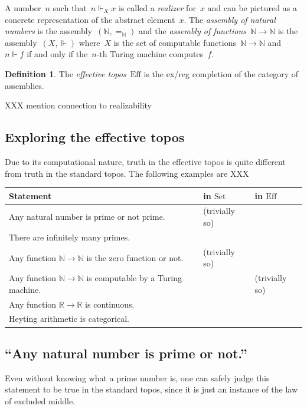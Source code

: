 \documentclass[oneside,reqno]{amsart}
\newcommand{\cmark}{\ding{51}}
\newcommand{\xmark}{\ding{55}}
\theoremstyle{definition}
\newtheorem{defn}{Definition}[section]
\theoremstyle{plain}
\theoremstyle{remark}
\newcommand{\NN}{\mathbb{N}}
\newcommand{\RR}{\mathbb{R}}
\newcommand{\Set}{\mathrm{Set}}
\newcommand{\Eff}{\mathrm{Ef{}f}}
\renewcommand{\_}{\mathpunct{.}\,}
\newcommand{\effective}{ef{}fective\xspace}
\newcommand{\?}{\,{:}\,}
\newcommand{\realizes}{\Vdash}
\begin{document}
A number~$n$ such that~$n \realizes_X x$ is called a \emph{realizer} for~$x$
and can be pictured as a concrete representation of the abstract element~$x$.
The \emph{assembly of natural numbers} is the assembly~$(\NN,{=_\NN})$ and the
\emph{assembly of functions~$\NN \to \NN$} is the
assembly~$(X,{\realizes})$ where~$X$ is the set of computable functions~$\NN
\to \NN$ and~$n \realizes f$ if and only if the~$n$-th Turing machine
computes~$f$.

\begin{defn}The \emph{\effective topos}~$\Eff$ is the ex/reg completion of the
category of assemblies.\end{defn}

XXX mention connection to realizability


\subsection{Exploring the \effective topos}
\label{sect:eff-examples}
Due to its computational nature, truth in the \effective topos is quite
different from truth in the standard topos. The following examples are XXX

\begin{tabular}{lll}
  \toprule
  Statement & in $\Set$ & in $\Eff$ \\
  \midrule
  Any natural number is prime or not prime. & \cmark{} (trivially so) & \cmark \\
  There are infinitely many primes. & \cmark & \cmark \\
  Any function $\NN \to \NN$ is the zero function or not. & \cmark{} (trivially so) & \xmark \\
  Any function $\NN \to \NN$ is computable by a Turing machine. & \xmark & \cmark{} (trivially so) \\
  Any function $\RR \to \RR$ is continuous. & \xmark & \cmark \\
  Heyting arithmetic is categorical. & \xmark & \cmark \\
  \bottomrule
\end{tabular}

\subsection{``Any natural number is prime or not.''} Even without knowing what
a prime number is, one can safely judge this statement to be true in
the standard topos, since it is just an instance of the law of excluded middle.
\end{document}
